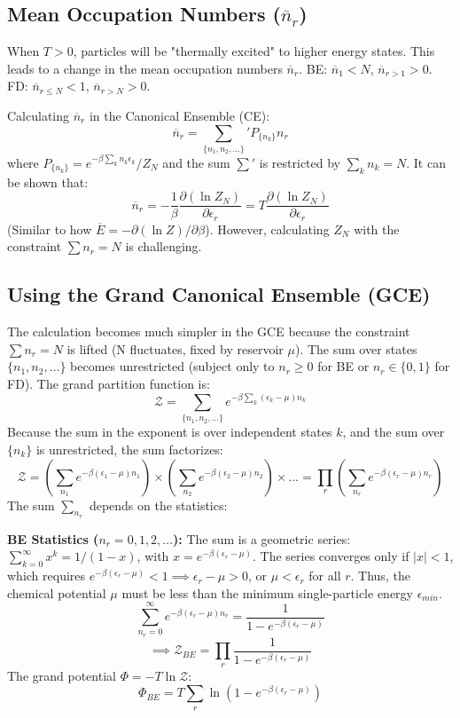 \documentclass[11pt]{article}
\newcommand{\avg}[1]{\overline{#1}}
\newcommand{\pderiv}[2]{\frac{\partial #1}{\partial #2}}
\newcommand{\grandpartfn}{\mathcal{Z}} %
\newcommand{\eps}{\epsilon}
\begin{document}
\subsection*{Mean Occupation Numbers ($\overline{n}_r$)}

When $T>0$, particles will be "thermally excited" to higher energy states. This leads to a change in the mean occupation numbers $\overline{n}_r$.
BE: $\overline{n}_1 < N$, $\overline{n}_{r>1} > 0$.
FD: $\overline{n}_{r \le N} < 1$, $\overline{n}_{r > N} > 0$.

Calculating $\overline{n}_r$ in the Canonical Ensemble (CE):
\[ \overline{n}_r = \sum_{\{n_1, n_2, \dots\}}' P_{\{n_k\}} n_r \]
where $P_{\{n_k\}} = e^{-\beta \sum_k n_k \eps_k} / Z_N$ and the sum $\sum'$ is restricted by $\sum_k n_k = N$.
It can be shown that:
\[ \overline{n}_r = -\frac{1}{\beta} \pderiv{(\ln Z_N)}{\eps_r} = T \pderiv{(\ln Z_N)}{\eps_r} \]
(Similar to how $\avg{E} = -\partial(\ln Z)/\partial \beta$).
However, calculating $Z_N$ with the constraint $\sum n_r = N$ is challenging.

\subsection*{Using the Grand Canonical Ensemble (GCE)}

The calculation becomes much simpler in the GCE because the constraint $\sum n_r = N$ is lifted (N fluctuates, fixed by reservoir $\mu$). The sum over states $\{n_1, n_2, \dots\}$ becomes unrestricted (subject only to $n_r \ge 0$ for BE or $n_r \in \{0,1\}$ for FD).
The grand partition function is:
\[ \grandpartfn = \sum_{\{n_1, n_2, \dots\}} e^{-\beta \sum_k (\eps_k - \mu) n_k} \]
Because the sum in the exponent is over independent states $k$, and the sum over $\{n_k\}$ is unrestricted, the sum factorizes:
\[ \grandpartfn = \left( \sum_{n_1} e^{-\beta(\eps_1-\mu)n_1} \right) \times \left( \sum_{n_2} e^{-\beta(\eps_2-\mu)n_2} \right) \times \dots = \prod_r \left( \sum_{n_r} e^{-\beta(\eps_r-\mu)n_r} \right) \]
The sum $\sum_{n_r}$ depends on the statistics:

\textbf{BE Statistics ($n_r = 0, 1, 2, \dots$):}
The sum is a geometric series: $\sum_{k=0}^\infty x^k = 1/(1-x)$, with $x = e^{-\beta(\eps_r-\mu)}$.
The series converges only if $|x|<1$, which requires $e^{-\beta(\eps_r-\mu)} < 1 \implies \eps_r - \mu > 0$, or $\mu < \eps_r$ for all $r$. Thus, the chemical potential $\mu$ must be less than the minimum single-particle energy $\eps_{min}$.
\[ \sum_{n_r=0}^{\infty} e^{-\beta(\eps_r-\mu)n_r} = \frac{1}{1 - e^{-\beta(\eps_r-\mu)}} \]
\[ \implies \grandpartfn_{BE} = \prod_r \frac{1}{1 - e^{-\beta(\eps_r-\mu)}} \]
The grand potential $\Phi = -T \ln \grandpartfn$:
\[ \Phi_{BE} = T \sum_r \ln(1 - e^{-\beta(\eps_r-\mu)}) \]
\end{document}
